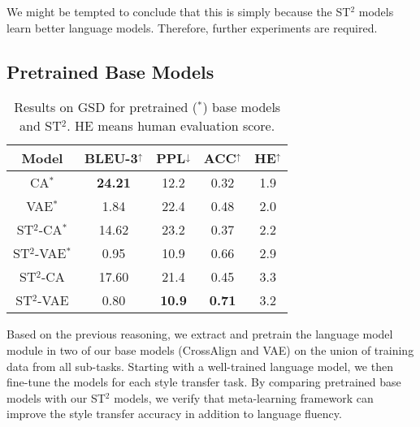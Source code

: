 We might be tempted to conclude that this is simply because the
ST$^2$ models learn better language models. 
Therefore, further experiments are required.
\subsection{Pretrained Base Models}
\label{sec:pretrain}
\begin{table}[ht]\footnotesize
	\centering
	\begin{tabular}{c|cccc}
		\hline
		\textbf{Model} & \textbf{BLEU-3}$^\uparrow$ & \textbf{PPL}$^\downarrow$ & \textbf{ACC}$^\uparrow$ & \textbf{HE}$^\uparrow$ \\
		\hline
		CA$^*$ &\textbf{24.21}   & 12.2 & 0.32 & 1.9 \\
		VAE$^*$ &1.84   & 22.4 & 0.48 & 2.0 \\
		\hline
		ST$^2$-CA$^*$ &14.62   & 23.2 & 0.37 &2.2  \\
		ST$^2$-VAE$^*$ &0.95   & 10.9 & 0.66  &2.9  \\
		\hline
		ST$^2$-CA & 17.60  & 21.4 & 0.45 & 3.3 \\
		ST$^2$-VAE & 0.80  & \textbf{10.9} & \textbf{0.71} & 3.2 \\
		\hline
	\end{tabular}
	\caption{Results on GSD for pretrained ($^*$) base models and ST$^2$. HE means human evaluation score.}\label{tb:exp2}
\end{table}
Based on the previous reasoning, we extract and pretrain the language model module in two of our base models (CrossAlign and VAE) on the union of training data from all sub-tasks. Starting with a well-trained language model, we then fine-tune the models for each style transfer task. By comparing pretrained base models with our ST$^2$ models, we verify that meta-learning framework can improve the style transfer accuracy in addition to language fluency.


